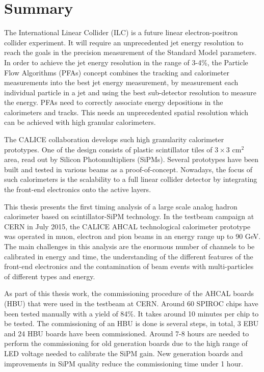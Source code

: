 \chapter{Summary}

The International Linear Collider (ILC) is a future linear electron-positron collider experiment. It will require an unprecedented jet energy resolution to reach the goals in the precision measurement of the Standard Model parameters. In order to achieve the jet energy resolution in the range of 3-4\%, the Particle Flow Algorithms (PFAs) concept combines the tracking and calorimeter measurements into the best jet energy measurement, by measurement each individual particle in a jet and using the best sub-detector resolution to measure the energy. PFAs need to correctly associate energy depositions in the calorimeters and tracks. This needs an unprecedented spatial resolution which can be achieved with high granular calorimeters.

The CALICE collaboration develops such high granularity calorimeter prototypes. One of the design consists of plastic scintillator tiles of $3\times3$ cm$^2$ area, read out by Silicon Photomultipliers (SiPMs). Several prototypes have been built and tested in various beams as a proof-of-concept. Nowadays, the focus of such calorimeters is the scalability to a full linear collider detector by integrating the front-end electronics onto the active layers.

This thesis presents the first timing analysis of a large scale analog hadron calorimeter based on scintillator-SiPM technology. In the testbeam campaign at CERN in July 2015, the CALICE AHCAL technological calorimeter prototype was operated in muon, electron and pion beams in an energy range up to 90 GeV. The main challenges in this analysis are the enormous number of channels to be calibrated in energy and time, the understanding of the different features of the front-end electronics and the contamination of beam events with multi-particles of different types and energy.

As part of this thesis work, the commissioning procedure of the AHCAL boards (HBU) that were used in the testbeam at CERN. Around 60 SPIROC chips have been tested manually with a yield of 84\%. It takes around 10 minutes per chip to be tested. The commissioning of an HBU is done is several steps, in total, 3 EBU and 24 HBU boards have been commissioned. Around 7-8 hours are needed to perform the commissioning for old generation boards due to the high range of LED voltage needed to calibrate the SiPM gain. New generation boards and improvements in SiPM quality reduce the commissioning time under 1 hour.

